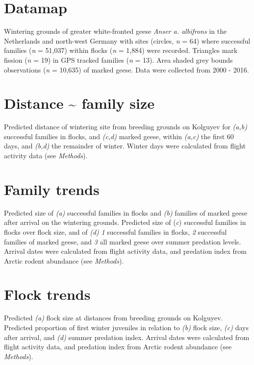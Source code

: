 \documentclass[]{article}
\date{}
\begin{document}
\section{Datamap}\label{datamap}

Wintering grounds of greater white-fronted geese \emph{Anser a.
albifrons} in the Netherlands and north-west Germany with sites
(circles, \emph{n} = 64) where successful families (\emph{n} = 51,037)
within flocks (\emph{n} = 1,884) were recorded. Triangles mark fission
(\emph{n} = 19) in GPS tracked families (\emph{n} = 13). Area shaded
grey bounds observations (\emph{n} = 10,635) of marked geese. Data were
collected from 2000 - 2016.

\section{Distance \textasciitilde{} family
size}\label{distance-family-size}

Predicted distance of wintering site from breeding grounds on Kolguyev
for \emph{(a,b)} successful families in flocks, and \emph{(c,d)} marked
geese, within \emph{(a,c)} the first 60 days, and \emph{(b,d)} the
remainder of winter. Winter days were calculated from flight activity
data (see \emph{Methods}).

\section{Family trends}\label{family-trends}

Predicted size of \emph{(a)} successful families in flocks and
\emph{(b)} families of marked geese after arrival on the wintering
grounds. Predicted size of (\emph{c}) successful families in flocks over
flock size, and of \emph{(d)} \emph{1} successful families in flocks,
\emph{2} successful families of marked geese, and \emph{3} all marked
geese over summer predation levels. Arrival dates were calculated from
flight activity data, and predation index from Arctic rodent abundance
(see \emph{Methods}).

\section{Flock trends}\label{flock-trends}

Predicted \emph{(a)} flock size at distances from breeding grounds on
Kolguyev. Predicted proportion of first winter juveniles in relation to
\emph{(b)} flock size, \emph{(c)} days after arrival, and \emph{(d)}
summer predation index. Arrival dates were calculated from flight
activity data, and predation index from Arctic rodent abundance (see
\emph{Methods}).
\end{document}
